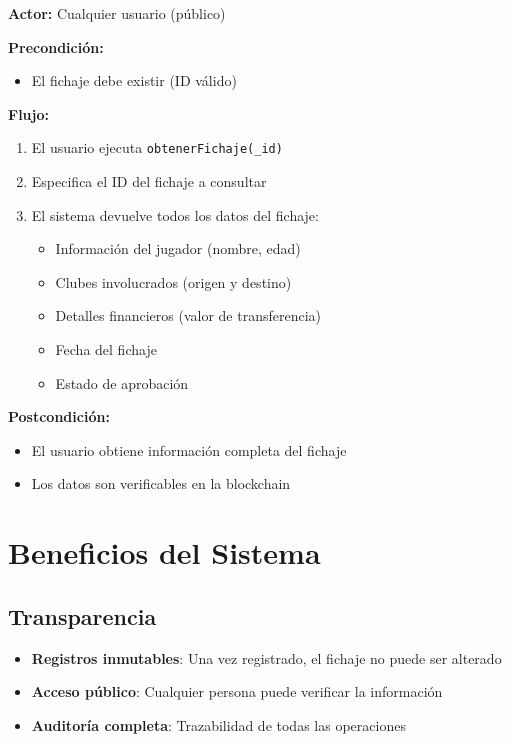 \documentclass[12pt,a4paper]{article}
\begin{document}
	\begin{tcolorbox}[title=Consulta de Fichaje,colback=yellow!5!white]
		\textbf{Actor:} Cualquier usuario (público)
		
		\textbf{Precondición:}
		\begin{itemize}
			\item El fichaje debe existir (ID válido)
		\end{itemize}
		
		\textbf{Flujo:}
		\begin{enumerate}
			\item El usuario ejecuta \texttt{obtenerFichaje(\_id)}
			\item Especifica el ID del fichaje a consultar
			\item El sistema devuelve todos los datos del fichaje:
			\begin{itemize}
				\item Información del jugador (nombre, edad)
				\item Clubes involucrados (origen y destino)
				\item Detalles financieros (valor de transferencia)
				\item Fecha del fichaje
				\item Estado de aprobación
			\end{itemize}
		\end{enumerate}
		
		\textbf{Postcondición:}
		\begin{itemize}
			\item El usuario obtiene información completa del fichaje
			\item Los datos son verificables en la blockchain
		\end{itemize}
	\end{tcolorbox}
	
	\section{Beneficios del Sistema}
	
	\subsection{Transparencia}
	\begin{itemize}
		\item \textbf{Registros inmutables}: Una vez registrado, el fichaje no puede ser alterado
		\item \textbf{Acceso público}: Cualquier persona puede verificar la información
		\item \textbf{Auditoría completa}: Trazabilidad de todas las operaciones
	\end{itemize}
	
\end{document}
